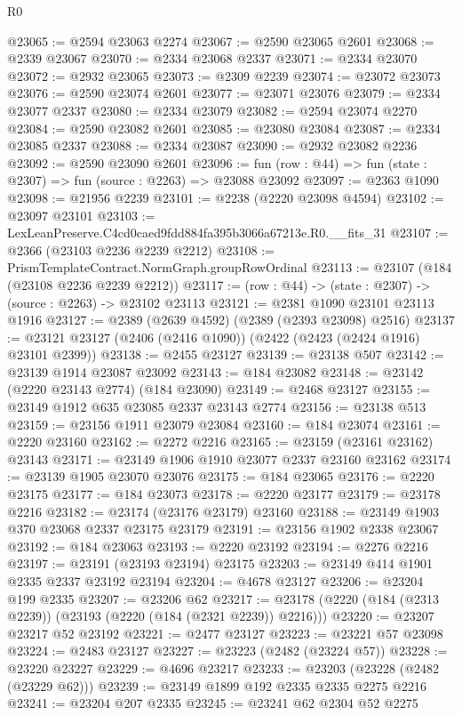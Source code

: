 \begin{lexlean}{R0}
\begin{coremodule}
@23065 := @2594 @23063 @2274
@23067 := @2590 @23065 @2601
@23068 := @2339 @23067
@23070 := @2334 @23068 @2337
@23071 := @2334 @23070
@23072 := @2932 @23065
@23073 := @2309 @2239
@23074 := @23072 @23073
@23076 := @2590 @23074 @2601
@23077 := @23071 @23076
@23079 := @2334 @23077 @2337
@23080 := @2334 @23079
@23082 := @2594 @23074 @2270
@23084 := @2590 @23082 @2601
@23085 := @23080 @23084
@23087 := @2334 @23085 @2337
@23088 := @2334 @23087
@23090 := @2932 @23082 @2236
@23092 := @2590 @23090 @2601
@23096 := fun (row : @44) => fun (state : @2307) => fun (source : @2263) => @23088 @23092
@23097 := @2363 @1090
@23098 := @21956 @2239
@23101 := @2238 (@2220 @23098 @4594)
@23102 := @23097 @23101
@23103 := LexLeanPreserve.C4cd0caed9fdd884fa395b3066a67213e.R0.__fits_31
@23107 := @2366 (@23103 @2236 @2239 @2212)
@23108 := PrismTemplateContract.NormGraph.groupRowOrdinal
@23113 := @23107 (@184 (@23108 @2236 @2239 @2212))
@23117 := (row : @44) -> (state : @2307) -> (source : @2263) -> @23102 @23113
@23121 := @2381 @1090 @23101 @23113 @1916
@23127 := @2389 (@2639 @4592) (@2389 (@2393 @23098) @2516)
@23137 := @23121 @23127 (@2406 (@2416 @1090)) (@2422 (@2423 (@2424 @1916) @23101 @2399))
@23138 := @2455 @23127
@23139 := @23138 @507
@23142 := @23139 @1914 @23087 @23092
@23143 := @184 @23082
@23148 := @23142 (@2220 @23143 @2774) (@184 @23090)
@23149 := @2468 @23127
@23155 := @23149 @1912 @635 @23085 @2337 @23143 @2774
@23156 := @23138 @513
@23159 := @23156 @1911 @23079 @23084
@23160 := @184 @23074
@23161 := @2220 @23160
@23162 := @2272 @2216
@23165 := @23159 (@23161 @23162) @23143
@23171 := @23149 @1906 @1910 @23077 @2337 @23160 @23162
@23174 := @23139 @1905 @23070 @23076
@23175 := @184 @23065
@23176 := @2220 @23175
@23177 := @184 @23073
@23178 := @2220 @23177
@23179 := @23178 @2216
@23182 := @23174 (@23176 @23179) @23160
@23188 := @23149 @1903 @370 @23068 @2337 @23175 @23179
@23191 := @23156 @1902 @2338 @23067
@23192 := @184 @23063
@23193 := @2220 @23192
@23194 := @2276 @2216
@23197 := @23191 (@23193 @23194) @23175
@23203 := @23149 @414 @1901 @2335 @2337 @23192 @23194
@23204 := @4678 @23127
@23206 := @23204 @199 @2335
@23207 := @23206 @62
@23217 := @23178 (@2220 (@184 (@2313 @2239)) (@23193 (@2220 (@184 (@2321 @2239)) @2216)))
@23220 := @23207 @23217 @52 @23192
@23221 := @2477 @23127
@23223 := @23221 @57 @23098
@23224 := @2483 @23127
@23227 := @23223 (@2482 (@23224 @57))
@23228 := @23220 @23227
@23229 := @4696 @23217
@23233 := @23203 (@23228 (@2482 (@23229 @62)))
@23239 := @23149 @1899 @192 @2335 @2335 @2275 @2216
@23241 := @23204 @207 @2335
@23245 := @23241 @62 @2304 @52 @2275

\end{coremodule}
\end{lexlean}
